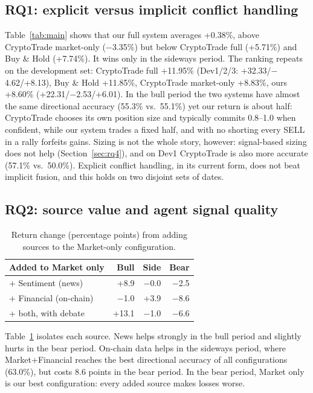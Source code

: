 \documentclass[11pt]{article}
\begin{document}
\subsection{RQ1: explicit versus implicit conflict handling}
Table~\ref{tab:main} shows that our full system averages +0.38\%, above CryptoTrade market-only ($-$3.35\%) but below
CryptoTrade full (+5.71\%) and Buy \& Hold (+7.74\%). It wins only in the sideways period. The ranking repeats on the
development set: CryptoTrade full +11.95\% (Dev1/2/3: +32.33/$-$4.62/+8.13), Buy \& Hold +11.85\%, CryptoTrade
market-only +8.83\%, ours +8.60\% (+22.31/$-$2.53/+6.01). In the bull period the two systems have almost the same
directional accuracy (55.3\% vs.\ 55.1\%) yet our return is about half: CryptoTrade chooses its own position size and
typically commits 0.8--1.0 when confident, while our system trades a fixed half, and with no shorting every SELL in a
rally forfeits gains. Sizing is not the whole story, however: signal-based sizing does not help
(Section~\ref{sec:rq4}), and on Dev1 CryptoTrade is also more accurate (57.1\% vs.\ 50.0\%). Explicit conflict handling,
in its current form, does not beat implicit fusion, and this holds on two disjoint sets of dates.

\subsection{RQ2: source value and agent signal quality}

\begin{table}[t]
\centering
\small
\begin{tabular}{lrrr}
\toprule
Added to Market only & Bull & Side & Bear \\
\midrule
+ Sentiment (news) & +8.9 & $-$0.0 & $-$2.5 \\
+ Financial (on-chain) & $-$1.0 & +3.9 & $-$8.6 \\
+ both, with debate & +13.1 & $-$1.0 & $-$6.6 \\
\bottomrule
\end{tabular}
\caption{Return change (percentage points) from adding sources to the Market-only configuration.}
\label{tab:sources}
\end{table}

Table~\ref{tab:sources} isolates each source. News helps strongly in the bull period and slightly hurts in the bear
period. On-chain data helps in the sideways period, where Market+Financial reaches the best directional accuracy of all
configurations (63.0\%), but costs 8.6 points in the bear period. In the bear period, Market only is our best
configuration: every added source makes losses worse.
\end{document}
